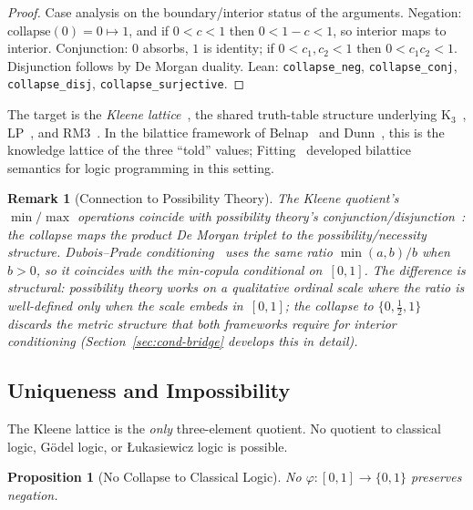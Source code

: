 \documentclass[11pt,a4paper]{article}
\newtheorem{proposition}[theorem]{Proposition}
\newtheorem{remark}[theorem]{Remark}
\begin{document}
\begin{proof}
Case analysis on the boundary/interior status of the arguments.
Negation: $\mathrm{collapse}(0) = 0 \mapsto 1$, and if
$0 < c < 1$ then $0 < 1 - c < 1$, so interior maps to interior.
Conjunction: $0$ absorbs, $1$ is identity; if $0 < c_1, c_2 < 1$
then $0 < c_1 c_2 < 1$.
Disjunction follows by De Morgan duality.
Lean: \texttt{collapse\_neg}, \texttt{collapse\_conj},
\texttt{collapse\_disj}, \texttt{collapse\_surjective}.
\end{proof}

The target is the \emph{Kleene lattice}~\cite{kleene1952}, the
shared truth-table structure underlying
K$_3$~\cite{kleene1952}, LP~\cite{asenjo1966,priest1979}, and
RM3~\cite{anderson1975,meyer1972}.
In the bilattice framework of Belnap~\cite{belnap1977} and
Dunn~\cite{dunn1976}, this is the knowledge lattice of the three
``told'' values; Fitting~\cite{fitting1991,fitting2006} developed
bilattice semantics for logic programming in this setting.

\begin{remark}[Connection to Possibility Theory]
\label{rem:possibility}
The Kleene quotient's $\min/\max$ operations coincide with
possibility theory's conjunction/disjunction~\cite{dubois1988}:
the collapse maps the product De Morgan triplet to the
possibility/necessity structure.
Dubois--Prade conditioning~\cite{dubois1988} uses the same ratio
$\min(a,b)/b$ when $b > 0$, so it coincides with the min-copula
conditional on~$[0,1]$.
The difference is structural: possibility theory works on a
qualitative ordinal scale where the ratio is well-defined only
when the scale embeds in~$[0,1]$; the collapse to
$\{0, \tfrac{1}{2}, 1\}$ discards the metric structure that both
frameworks require for interior conditioning
(Section~\ref{sec:cond-bridge} develops this in detail).
\end{remark}

\subsection{Uniqueness and Impossibility}
\label{sec:impossibility}

The Kleene lattice is the \emph{only} three-element quotient.
No quotient to classical logic, G\"odel logic, or \L ukasiewicz
logic is possible.

\begin{proposition}[No Collapse to Classical Logic]
\label{prop:no-classical}
No $\varphi : [0,1] \to \{0, 1\}$ preserves negation.
\end{proposition}
\end{document}
